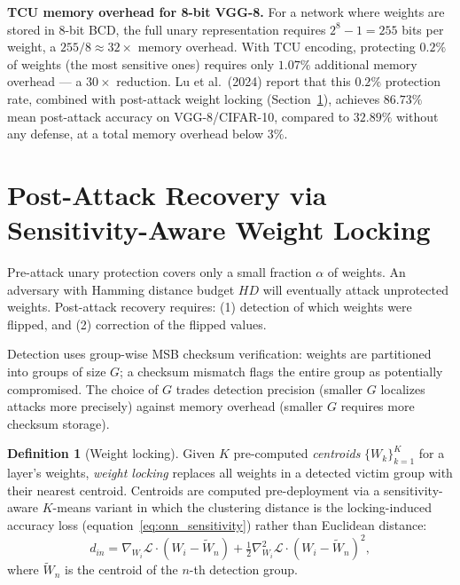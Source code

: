 \documentclass[11pt, openright, twoside]{book}
\theoremstyle{plain}
\theoremstyle{definition}
\newtheorem{definition}[theorem]{Definition}
\theoremstyle{remark}
\begin{document}
\begin{exbox}
\textbf{TCU memory overhead for 8-bit VGG-8.} For a network where weights are stored
in 8-bit BCD, the full unary representation requires $2^8-1=255$ bits per weight,
a $255/8\approx 32\times$ memory overhead. With TCU encoding, protecting $0.2\%$ of
weights (the most sensitive ones) requires only $1.07\%$ additional memory overhead ---
a $30\times$ reduction. Lu et al.\ (2024) report that this $0.2\%$ protection rate,
combined with post-attack weight locking (Section~\ref{sec:weight_locking}), achieves
$86.73\%$ mean post-attack accuracy on VGG-8/CIFAR-10, compared to $32.89\%$ without
any defense, at a total memory overhead below $3\%$.
\end{exbox}

\section{Post-Attack Recovery via Sensitivity-Aware Weight Locking}
\label{sec:weight_locking}

Pre-attack unary protection covers only a small fraction $\alpha$ of weights. An adversary
with Hamming distance budget $HD$ will eventually attack unprotected weights.
Post-attack recovery requires: (1) detection of which weights were flipped, and
(2) correction of the flipped values.

Detection uses group-wise MSB checksum verification: weights are partitioned into groups
of size $G$; a checksum mismatch flags the entire group as potentially compromised.
The choice of $G$ trades detection precision (smaller $G$ localizes attacks more
precisely) against memory overhead (smaller $G$ requires more checksum storage).

\begin{definition}[Weight locking]
\label{def:weight_locking}
Given $K$ pre-computed \emph{centroids} $\{W_k\}_{k=1}^K$ for a layer's weights,
\emph{weight locking} replaces all weights in a detected victim group with their
nearest centroid. Centroids are computed pre-deployment via a sensitivity-aware
$K$-means variant in which the clustering distance is the locking-induced accuracy loss
(equation~\eqref{eq:onn_sensitivity}) rather than Euclidean distance:
\begin{equation}
  d_{in} = \nabla_{W_i}\mathcal{L}\cdot(W_i - \widetilde{W}_n)
  + \tfrac{1}{2}\nabla^2_{W_i}\mathcal{L}\cdot(W_i - \widetilde{W}_n)^2,
  \label{eq:locking_distance}
\end{equation}
where $\widetilde{W}_n$ is the centroid of the $n$-th detection group.
\end{definition}
\end{document}
